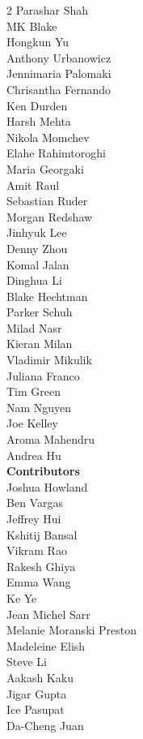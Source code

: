 \begin{multicols}{2}
Parashar Shah \\
MK Blake \\
Hongkun Yu \\
Anthony Urbanowicz \\
Jennimaria Palomaki \\
Chrisantha Fernando \\
Ken Durden \\
Harsh Mehta \\
Nikola Momchev \\
Elahe Rahimtoroghi \\
Maria Georgaki \\
Amit Raul \\
Sebastian Ruder \\
Morgan Redshaw \\
Jinhyuk Lee \\
Denny Zhou \\
Komal Jalan \\
Dinghua Li \\
Blake Hechtman \\
Parker Schuh \\
Milad Nasr \\
Kieran Milan \\
Vladimir Mikulik \\
Juliana Franco \\
Tim Green \\
Nam Nguyen \\
Joe Kelley \\
Aroma Mahendru \\
Andrea Hu \\
\textbf{Contributors} \\
Joshua Howland \\
Ben Vargas \\
Jeffrey Hui \\
Kshitij Bansal \\
Vikram Rao \\
Rakesh Ghiya \\
Emma Wang \\
Ke Ye \\
Jean Michel Sarr \\
Melanie Moranski Preston \\
Madeleine Elish \\
Steve Li \\
Aakash Kaku \\
Jigar Gupta \\
Ice Pasupat \\
Da-Cheng Juan \\

\end{multicols}
